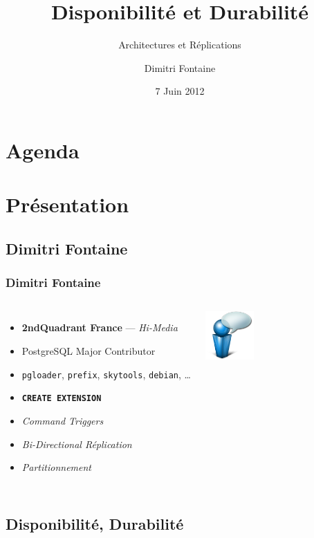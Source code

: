 \documentclass[english]{beamer}
\title{Disponibilité et Durabilité}
\subtitle{Architectures et Réplications}
\author{Dimitri Fontaine}
\date{7 Juin 2012}
\begin{document}
\frame{\titlepage}

\section*{Agenda}

\section{Présentation}

\subsection{Dimitri Fontaine}

\begin{frame}[fragile]
  \frametitle{Dimitri Fontaine}

\begin{columns}[c]

  \begin{itemize}
   \item<1-> \alert{\textbf{2ndQuadrant France}} — \textit{Hi-Media}
   \item<2-> \alert{PostgreSQL Major Contributor}
   \item<2-> \texttt{pgloader}, \texttt{prefix}, \texttt{skytools}, \texttt{debian}, …
   \item<3-> \texttt{\textbf{CREATE EXTENSION}}
   \item<4-> \textit{Command Triggers}
   \item<4-> \textit{Bi-Directional Réplication}
   \item<4-> \textit{Partitionnement}
  \end{itemize}  

\begin{center}
  \includegraphics[height=5em]{bulle-blue-icon.png}
\end{center}
\end{columns}
\end{frame}

\subsection{Disponibilité, Durabilité}
\end{document}
